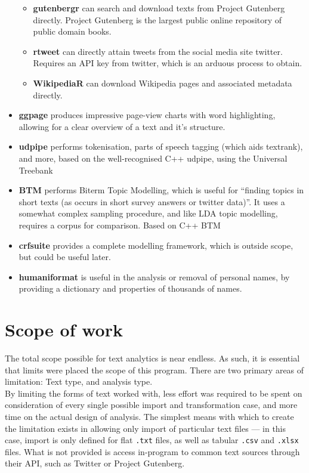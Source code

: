 \documentclass[11pt, a4paper, twoside, titlepage]{report}
\begin{document}
\begin{itemize}
  \begin{itemize}
  \item \textbf{gutenbergr}\autocite{robinson19} can search and download texts from Project
    Gutenberg directly. Project Gutenberg is the largest public online
    repository of public domain books.
  \item \textbf{rtweet}\autocite{rtweet-package} can directly attain tweets from the social
    media site twitter. Requires an API key from twitter, which is an
    arduous process to obtain.
  \item \textbf{WikipediaR}\autocite{bar-hen16:_wikip} can download Wikipedia pages and
    associated metadata directly.
  \end{itemize}
\item \textbf{ggpage}\autocite{hvitfeldt19ggpage} produces impressive page-view charts with word
  highlighting, allowing for a clear overview of a text and it's
  structure.
\item \textbf{udpipe}\autocite{wijffels19:udpipe} performs tokenisation, parts of speech tagging
  (which aids textrank), and more, based on the well-recognised C++
  udpipe, using the Universal Treebank
\item \textbf{BTM}\autocite{wijffels19:_btm} performs Biterm Topic Modelling, which is useful
  for ``finding topics in short texts (as occurs in short survey
  answers or twitter data)''. It uses a somewhat complex sampling
  procedure, and like LDA topic modelling, requires a corpus for
  comparison. Based on C++ BTM
\item \textbf{crfsuite}\autocite{wijffels18crf} provides a complete modelling framework, which
  is outside scope, but could be useful later.
\item \textbf{humaniformat}\autocite{keyes16} is useful in the analysis or removal of
  personal names, by providing a dictionary and properties of
  thousands of names.
\end{itemize}

\section{Scope of work}\label{sec:scope-work}

The total scope possible for text analytics is near endless. As such,
it is essential that limits were placed the scope of this program.
There are two primary areas of limitation: Text type, and analysis type.\\

By limiting the forms of text worked with, less effort was required to
be spent on consideration of every single possible import and
transformation case, and more time on the actual design of analysis.
The simplest means with which to create the limitation exists in
allowing only import of particular text files --- in this case, import
is only defined for flat \texttt{.txt} files, as well as tabular
\texttt{.csv} and \texttt{.xlsx} files. What is not provided is access
in-program to common text sources through their API, such as Twitter
or Project Gutenberg.
\end{document}
